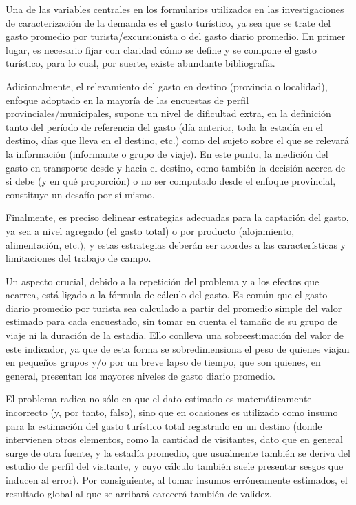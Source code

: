 \documentclass[
]{book}
\begin{document}
Una de las variables centrales en los formularios utilizados en las investigaciones de caracterización de la demanda es el gasto turístico, ya sea que se trate del gasto promedio por turista/excursionista o del gasto diario promedio. En primer lugar, es necesario fijar con claridad cómo se define y se compone el gasto turístico, para lo cual, por suerte, existe abundante bibliografía.

Adicionalmente, el relevamiento del gasto en destino (provincia o localidad), enfoque adoptado en la mayoría de las encuestas de perfil provinciales/municipales, supone un nivel de dificultad extra, en la definición tanto del período de referencia del gasto (día anterior, toda la estadía en el destino, días que lleva en el destino, etc.) como del sujeto sobre el que se relevará la información (informante o grupo de viaje). En este punto, la medición del gasto en transporte desde y hacia el destino, como también la decisión acerca de si debe (y en qué proporción) o no ser computado desde el enfoque provincial, constituye un desafío por sí mismo.

Finalmente, es preciso delinear estrategias adecuadas para la captación del gasto, ya sea a nivel agregado (el gasto total) o por producto (alojamiento, alimentación, etc.), y estas estrategias deberán ser acordes a las características y limitaciones del trabajo de campo.

Un aspecto crucial, debido a la repetición del problema y a los efectos que acarrea, está ligado a la fórmula de cálculo del gasto. Es común que el gasto diario promedio por turista sea calculado a partir del promedio simple del valor estimado para cada encuestado, sin tomar en cuenta el tamaño de su grupo de viaje ni la duración de la estadía. Ello conlleva una sobreestimación del valor de este indicador, ya que de esta forma se sobredimensiona el peso de quienes viajan en pequeños grupos y/o por un breve lapso de tiempo, que son quienes, en general, presentan los mayores niveles de gasto diario promedio.

El problema radica no sólo en que el dato estimado es matemáticamente incorrecto (y, por tanto, falso), sino que en ocasiones es utilizado como insumo para la estimación del gasto turístico total registrado en un destino (donde intervienen otros elementos, como la cantidad de visitantes, dato que en general surge de otra fuente, y la estadía promedio, que usualmente también se deriva del estudio de perfil del visitante, y cuyo cálculo también suele presentar sesgos que inducen al error). Por consiguiente, al tomar insumos erróneamente estimados, el resultado global al que se arribará carecerá también de validez.
\end{document}
